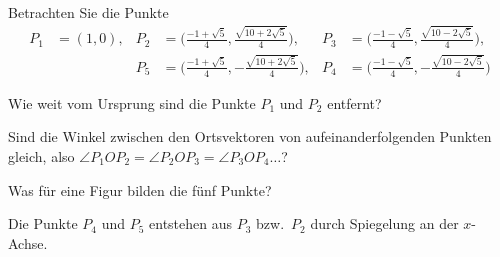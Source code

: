 Betrachten Sie die Punkte
\begin{align*}
P_1&=(1,0),
&P_2&=\biggl(\frac{-1+\sqrt{5}}4, \frac{\sqrt{10+2\sqrt{5}}}4 \biggr),
&P_3&=\biggl(\frac{-1-\sqrt{5}}4, \frac{\sqrt{10-2\sqrt{5}}}4 \biggr),\\
&&P_5&=\biggl(\frac{-1+\sqrt{5}}4,-\frac{\sqrt{10+2\sqrt{5}}}4 \biggr),
&P_4&=\biggl(\frac{-1-\sqrt{5}}4,-\frac{\sqrt{10-2\sqrt{5}}}4 \biggr)
\end{align*}
\begin{teilaufgaben}
\item Wie weit vom Ursprung sind die Punkte $P_1$ und $P_2$ 
entfernt?
\item Sind die Winkel zwischen den Ortsvektoren von aufeinanderfolgenden
Punkten gleich, also $\angle P_1OP_2=\angle P_2OP_3=\angle P_3OP_4\dots$?
\item Was für eine Figur bilden die fünf Punkte?
\end{teilaufgaben}


\begin{hinweis}
Die Punkte $P_4$ und $P_5$ entstehen aus $P_3$ bzw.~$P_2$ durch
Spiegelung an der $x$-Achse.
\end{hinweis}

